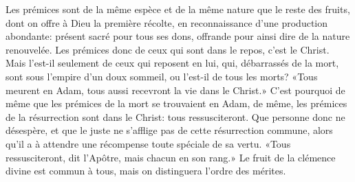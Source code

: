Les prémices sont de la même espèce
		et de la même nature que le reste des fruits,
	dont on offre à Dieu la première récolte,
	en reconnaissance d’une production abondante:
	présent sacré pour tous ses dons,
	offrande pour ainsi dire de la nature renouvelée.
Les prémices donc de ceux qui sont dans le repos, c’est le Christ.
Mais l’est-il seulement de ceux qui reposent en lui,
	qui, débarrassés de la mort, sont sous l’empire d’un doux sommeil,
	ou l’est-il de tous les morts?
	«Tous meurent en Adam, tous aussi recevront la vie dans le Christ.»
C’est pourquoi de même que les prémices de la mort se trouvaient en Adam,
	de même, les prémices de la résurrection sont dans le Christ:
	tous ressusciteront.
Que personne donc ne désespère,
	et que le juste ne s’afflige pas de cette résurrection commune,
	alors qu’il a à attendre une récompense toute spéciale de sa vertu.
«Tous ressusciteront, dit l’Apôtre,
	mais chacun en son rang.»
Le fruit de la clémence divine est commun à tous,
	mais on distinguera l’ordre des mérites.

